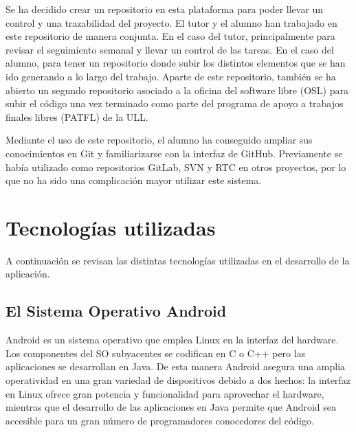 Se ha decidido crear un repositorio en esta plataforma para poder llevar un control y una trazabilidad del proyecto. El tutor y el alumno han trabajado en este repositorio de manera conjunta. En el caso del tutor, principalmente para revisar el seguimiento semanal y llevar un control de las tareas. En el caso del alumno, para tener un repositorio donde subir los distintos elementos que se han ido generando a lo largo del trabajo. Aparte de este repositorio, también se ha abierto un segundo repositorio \cite{URL::repositorioAplicacion} asociado a la oficina del software libre (OSL) para subir el código una vez terminado como parte del programa de apoyo a trabajos finales libres (PATFL) \cite{URL::PATFL} de la ULL.


Mediante el uso de este repositorio, el alumno ha conseguido ampliar sus conocimientos en Git y familiarizarse con la interfaz de GitHub. Previamente se había utilizado como repositorios GitLab, SVN y RTC en otros proyectos, por lo que no ha sido una complicación mayor utilizar este sistema.





\section{Tecnologías utilizadas}

A continuación se revisan las distintas tecnologías utilizadas en el desarrollo de la aplicación.

\subsection{El Sistema Operativo Android}

Android es un sistema operativo que emplea Linux en la interfaz del hardware.  Los componentes del SO subyacentes se codifican en C o C++ pero las aplicaciones se desarrollan en Java. De esta manera Android asegura una amplia operatividad en una gran variedad de dispositivos debido a dos hechos: la interfaz en Linux ofrece gran potencia y funcionalidad para aprovechar el hardware, mientras que el desarrollo de las aplicaciones en Java permite que Android sea accesible para un gran número de programadores conocedores del código.

